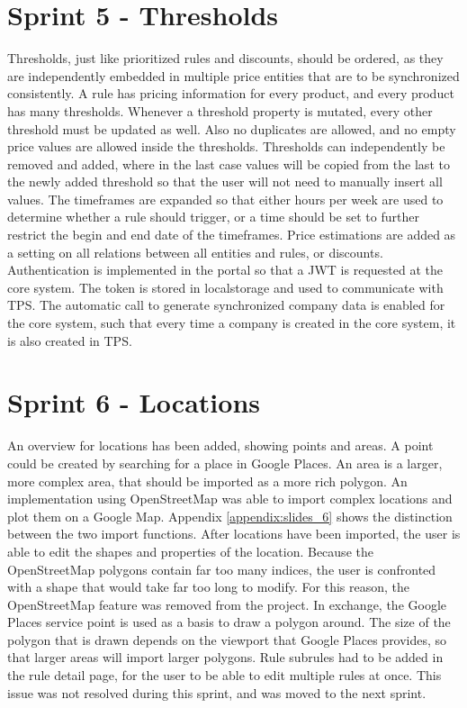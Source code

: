 %
\section{Sprint 5 - Thresholds}
Thresholds, just like prioritized rules and discounts, should be ordered, as they are independently embedded in multiple price entities that are to be synchronized consistently. A rule has pricing information for every product, and every product has many thresholds. Whenever a threshold property is mutated, every other threshold must be updated as well. Also no duplicates are allowed, and no empty price values are allowed inside the thresholds. Thresholds can independently be removed and added, where in the last case values will be copied from the last to the newly added threshold so that the user will not need to manually insert all values. The timeframes are expanded so that either hours per week are used to determine whether a rule should trigger, or a time should be set to further restrict the begin and end date of the timeframes. Price estimations are added as a setting on all relations between all entities and rules, or discounts. Authentication is implemented in the portal so that a JWT is requested at the core system. The token is stored in localstorage and used to communicate with TPS. The automatic call to generate synchronized company data is enabled for the core system, such that every time a company is created in the core system, it is also created in TPS.

%
\section{Sprint 6 - Locations}
An overview for locations has been added, showing points and areas. A point could be created by searching for a place in Google Places. An area is a larger, more complex area, that should be imported as a more rich polygon. An implementation using OpenStreetMap was able to import complex locations and plot them on a Google Map. Appendix \ref{appendix:slides_6} shows the distinction between the two import functions. After locations have been imported, the user is able to edit the shapes and properties of the location. Because the OpenStreetMap polygons contain far too many indices, the user is confronted with a shape that would take far too long to modify. For this reason, the OpenStreetMap feature was removed from the project. In exchange, the Google Places service point is used as a basis to draw a polygon around. The size of the polygon that is drawn depends on the viewport that Google Places provides, so that larger areas will import larger polygons. Rule subrules had to be added in the rule detail page, for the user to be able to edit multiple rules at once. This issue was not resolved during this sprint, and was moved to the next sprint.

